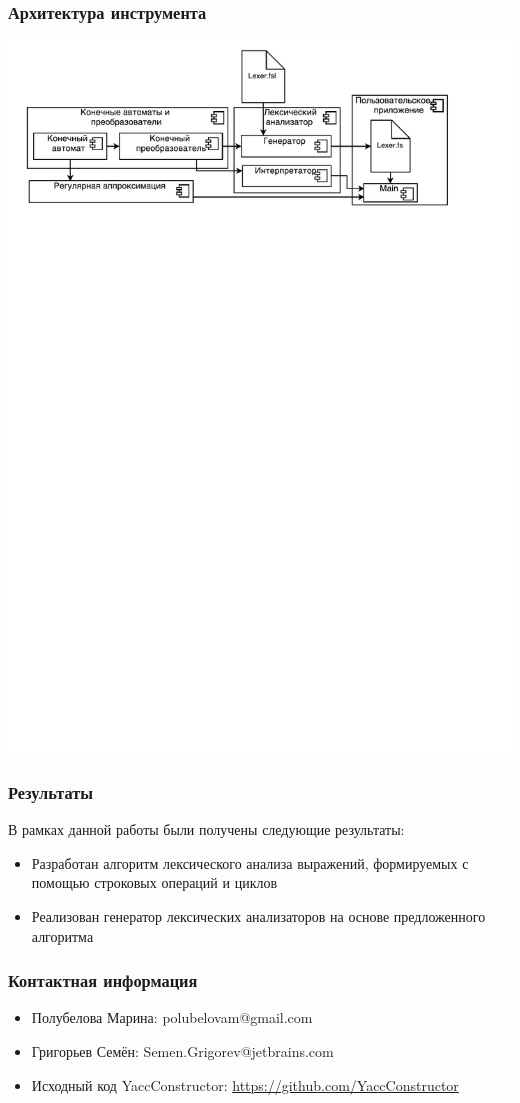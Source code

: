\documentclass{beamer}
\begin{document}
\begin{frame}
\transwipe[direction=90]
\frametitle{Архитектура инструмента}
\begin{center}
   {\includegraphics[width=1.0\linewidth]{LexerArch}}
\end{center}
\end{frame}


\begin{frame}[fragile]
\transwipe[direction=90]
\frametitle{Результаты}
В рамках данной работы были получены следующие результаты:
\begin{itemize}
\item Разработан алгоритм лексического анализа выражений, формируемых с помощью строковых операций и циклов
\item Реализован генератор лексических анализаторов на основе предложенного алгоритма
\end{itemize}
\end{frame}


\begin{frame}
\transwipe[direction=90]
\frametitle{Контактная информация}
\begin{itemize}
\item Полубелова Марина: polubelovam@gmail.com
\item Григорьев Семён: Semen.Grigorev@jetbrains.com
\item Исходный код YaccConstructor:
\url{https://github.com/YaccConstructor}
\end{itemize}
\end{frame}
\end{document}
